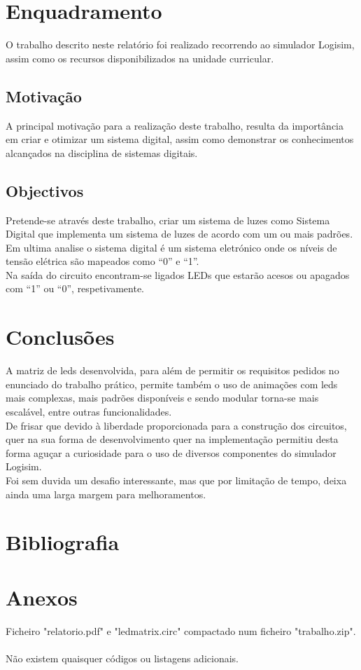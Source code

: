 \documentclass[12pt,a4paper,portrait]{article}
\begin{document}
	\section{Enquadramento}
	O trabalho descrito neste relatório foi realizado recorrendo ao simulador Logisim, assim como os recursos disponibilizados na unidade curricular.\\
		\subsection{Motivação}
			A principal motivação para a realização deste trabalho, resulta da importância em criar e otimizar um sistema digital, assim como demonstrar os conhecimentos alcançados na disciplina de sistemas digitais.\\
		\subsection{Objectivos}
			Pretende-se através deste trabalho, criar um sistema de luzes como \cite{Csoares}Sistema Digital que implementa um sistema de luzes de acordo com um ou mais padrões.\\		
			Em ultima analise o sistema digital é um sistema eletrónico onde os níveis de tensão elétrica são  mapeados como “0” e “1”.\\
			Na saída do circuito encontram-se ligados LEDs que estarão acesos ou apagados com “1” ou “0”, respetivamente.\\
	\section{Conclusões}
		A matriz de leds desenvolvida, para além de permitir os requisitos pedidos no enunciado do trabalho prático, permite também o uso de animações com leds mais complexas, mais padrões disponíveis e sendo modular torna-se mais escalável, entre outras funcionalidades.\\
		De frisar que devido à liberdade proporcionada para a construção dos circuitos, quer na sua forma de desenvolvimento quer na implementação permitiu desta forma aguçar a curiosidade para o uso de diversos componentes do simulador Logisim.\\
		Foi sem duvida um desafio interessante, mas que por limitação de tempo, deixa ainda uma larga margem para melhoramentos.\\
	\newpage
	\section{Bibliografia}
	
	

	\newpage
	\section{Anexos}
		Ficheiro "relatorio.pdf" e "ledmatrix.circ" compactado num ficheiro "trabalho.zip".\\\\
		Não existem quaisquer códigos ou listagens adicionais.\\					
\end{document}
